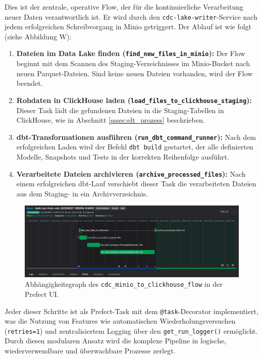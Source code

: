 \documentclass[
    12pt,               
    a4paper,        
    ngerman            
]{scrartcl}
\begin{document}
Dies ist der zentrale, operative Flow, der für die kontinuierliche Verarbeitung neuer Daten verantwortlich ist. Er wird durch den \texttt{cdc-lake-writer}-Service nach jedem erfolgreichen Schreibvorgang in Minio getriggert. Der Ablauf ist wie folgt (siehe Abbildung W): %
\begin{enumerate}
    \item \textbf{Dateien im Data Lake finden (\texttt{find\_new\_files\_in\_minio}):} Der Flow beginnt mit dem Scannen des Staging-Verzeichnisses im Minio-Bucket nach neuen Parquet-Dateien. Sind keine neuen Dateien vorhanden, wird der Flow beendet.
    
    \item \textbf{Rohdaten in ClickHouse laden (\texttt{load\_files\_to\_clickhouse\_staging}):} Dieser Task lädt die gefundenen Dateien in die Staging-Tabellen in ClickHouse, wie in Abschnitt \ref{sssec:elt_prozess} beschrieben.
    
    \item \textbf{dbt-Transformationen ausführen (\texttt{run\_dbt\_command\_runner}):} Nach dem erfolgreichen Laden wird der Befehl \texttt{dbt build} gestartet, der alle definierten Modelle, Snapshots und Tests in der korrekten Reihenfolge ausführt.
    
    \item \textbf{Verarbeitete Dateien archivieren (\texttt{archive\_processed\_files}):} Nach einem erfolgreichen dbt-Lauf verschiebt dieser Task die verarbeiteten Dateien aus dem Staging- in ein Archivverzeichnis.
\end{enumerate}

\begin{figure}[h!]
    \centering
    \includegraphics[width=\textwidth]{cdc-flow.png} %
    \caption{Abhängigkeitsgraph des \texttt{cdc\_minio\_to\_clickhouse\_flow} in der Prefect UI.}
    \label{fig:cdc_flow}
\end{figure}

Jeder dieser Schritte ist als Prefect-Task mit dem \texttt{@task}-Decorator implementiert, was die Nutzung von Features wie automatischen Wiederholungsversuchen (\texttt{retries=1}) und zentralisiertem Logging über den \texttt{get\_run\_logger()} ermöglicht. Durch diesen modularen Ansatz wird die komplexe Pipeline in logische, wiederverwendbare und überwachbare Prozesse zerlegt.
\end{document}
